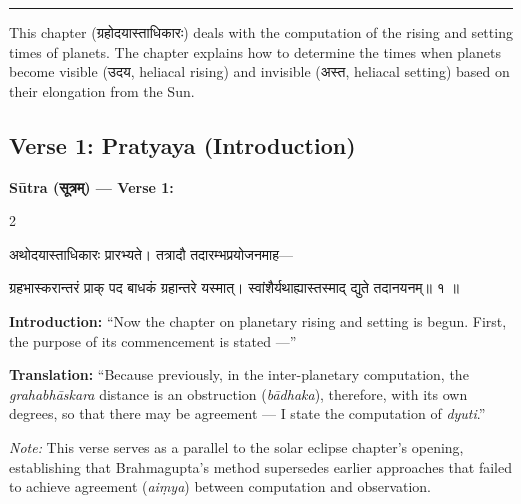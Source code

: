 \documentclass[11pt,a4paper]{article}
\newcommand{\dev}[1]{{\devanagarifont #1}}
\newenvironment{sanskritverse}{%
  \begin{center}\begin{minipage}{0.95\textwidth}
  \setlength{\leftskip}{1em}
  \setlength{\rightskip}{1em}
  \dev
}{\end{minipage}\end{center}}
\begin{document}
\begin{center}
\textcolor{rulecolor}{\rule{0.8\textwidth}{0.5pt}}
\end{center}

This chapter (\dev{ग्रहोदयास्ताधिकारः}) deals with the computation of the rising and setting times of planets. The chapter explains how to determine the times when planets become visible (\dev{उदय}, heliacal rising) and invisible (\dev{अस्त}, heliacal setting) based on their elongation from the Sun.

\subsection{Verse 1: Pratyaya (Introduction)}

\vspace{0.5em}
\noindent\textbf{Sūtra (\dev{सूत्रम्}) — Verse 1:}

\begin{paracol}{2}

\begin{sanskritverse}
अथोदयास्ताधिकारः प्रारभ्यते। तत्रादौ तदारम्भप्रयोजनमाह—
\end{sanskritverse}

\begin{sanskritverse}
ग्रहभास्करान्तरं प्राक् पद बाधकं ग्रहान्तरे यस्मात्।
स्वांशैर्यथाह्यास्तस्माद् द्युते तदानयनम्॥ १ ॥
\end{sanskritverse}

\switchcolumn

\textbf{Introduction:} ``Now the chapter on planetary rising and setting is begun. First, the purpose of its commencement is stated ---''

\textbf{Translation:} ``Because previously, in the inter-planetary computation, the \textit{grahabhāskara} distance is an obstruction (\textit{bādhaka}), therefore, with its own degrees, so that there may be agreement --- I state the computation of \textit{dyuti}.''

\textit{Note:} This verse serves as a parallel to the solar eclipse chapter's opening, establishing that Brahmagupta's method supersedes earlier approaches that failed to achieve agreement (\textit{aiṃya}) between computation and observation.

\end{paracol}
\end{document}
